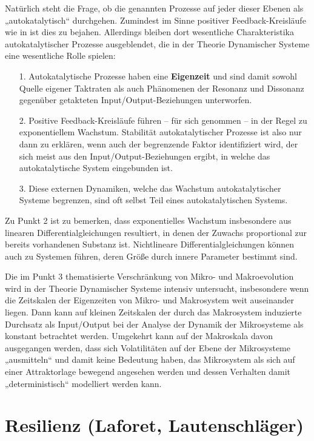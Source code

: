 \documentclass[11pt,a4paper]{article}
\begin{document}
Natürlich steht die Frage, ob die genannten Prozesse auf jeder dieser Ebenen
als „autokatalytisch“ durchgehen. Zumindest im Sinne positiver
Feedback-Kreisläufe wie in \cite{Ulanowicz2009} ist dies zu bejahen.
Allerdings bleiben dort wesentliche Charakteristika autokatalytischer Prozesse
ausgeblendet, die in der Theorie Dynamischer Systeme eine wesentliche Rolle
spielen:
\begin{itemize}[noitemsep]
\item[1.] Autokatalytische Prozesse haben eine \textbf{Eigenzeit} und sind
  damit sowohl Quelle eigener Taktraten als auch Phänomenen der Resonanz und
  Dissonanz gegenüber getakteten Input/Output-Beziehungen unterworfen.
\item[2.] Positive Feedback-Kreisläufe führen -- für sich genommen -- in der
  Regel zu exponentiellem Wachstum.  Stabilität autokatalytischer Prozesse ist
  also nur dann zu erklären, wenn auch der begrenzende Faktor identifiziert
  wird, der sich meist aus den Input/Output-Beziehungen ergibt, in welche das
  autokatalytische System eingebunden ist.

\item[3.] Diese externen Dynamiken, welche das Wachstum autokatalytischer
  Systeme begrenzen, sind oft selbst Teil eines autokatalytischen Systems.
\end{itemize}
Zu Punkt 2 ist zu bemerken, dass exponentielles Wachstum insbesondere aus
linearen Differentialgleichungen resultiert, in denen der Zuwachs proportional
zur bereits vorhandenen Substanz ist. Nichtlineare Differentialgleichungen
können auch zu Systemen führen, deren Größe durch innere Parameter bestimmt
sind. 

Die im Punkt 3 thematisierte Verschränkung von Mikro- und Makroevolution wird
in der Theorie Dynamischer Systeme intensiv untersucht, insbesondere wenn die
Zeitskalen der Eigenzeiten von Mikro- und Makrosystem weit auseinander liegen.
Dann kann auf kleinen Zeit\-skalen der durch das Makrosystem induzierte
Durchsatz als Input/Output bei der Analyse der Dynamik der Mikrosysteme als
konstant betrachtet werden.  Umgekehrt kann auf der Makroskala davon
ausgegangen werden, dass sich Volatilitäten auf der Ebene der Mikrosysteme
„ausmitteln“ und damit keine Bedeutung haben, das Mikrosystem als sich auf
einer Attraktorlage bewegend angesehen werden und dessen Verhalten damit
„deterministisch“ modelliert werden kann.

\section{Resilienz (Laforet, Lautenschläger)}
\end{document}
